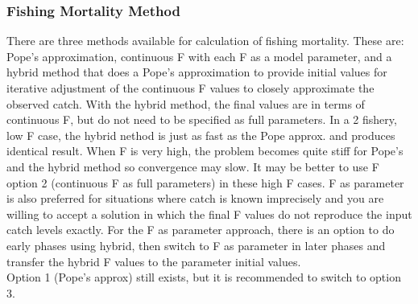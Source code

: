 \subsubsection{Fishing Mortality Method}
There are  three methods available for calculation of fishing mortality.  These are:  Pope’s approximation, continuous F with each F as a model parameter, and a hybrid method that does a Pope’s approximation to provide initial values for iterative adjustment of the continuous F values to closely approximate the observed catch.  With the hybrid method, the final values are in terms of continuous F, but do not need to be specified as full parameters.  In a 2 fishery, low F case, the hybrid nethod is just as fast as the Pope approx. and produces identical result.  When F is very high, the problem becomes quite stiff for Pope’s and the hybrid method so convergence may slow.  It may  be better to use F option 2 (continuous F as full parameters) in these high F cases.  F as parameter is also preferred for situations where catch is known imprecisely and you are willing to accept a solution in which the final F values do not reproduce the input catch levels exactly.  For the F as parameter approach, there is an option to do early phases using hybrid, then switch to F as parameter in later phases and transfer the hybrid F values to the parameter initial values.\\
Option 1 (Pope’s approx) still exists, but it is recommended to switch to option 3.

